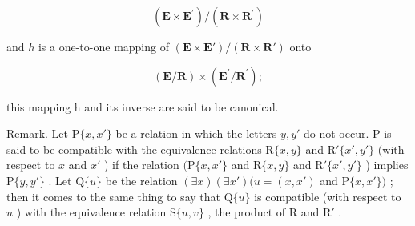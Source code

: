 \[
(\mathbf {E} \times \mathbf {E} ^ {\prime}) / (\mathbf {R} \times \mathbf {R} ^ {\prime})
\]

and \(h\) is a one-to-one mapping of \((\mathbf{E} \times \mathbf{E}') / (\mathbf{R} \times \mathbf{R}')\) onto

\[
(\mathbf {E} / \mathbf {R}) \times (\mathbf {E} ^ {\prime} / \mathbf {R} ^ {\prime});
\]

this mapping h and its inverse are said to be canonical.

Remark. Let \(\mathrm{P}\{x, x'\}\) be a relation in which the letters \(y, y'\) do not occur. P is said to be compatible with the equivalence relations \(\mathrm{R}\{x, y\}\) and \(\mathrm{R}'\{x', y'\}\) (with respect to \(x\) and \(x'\) ) if the relation \((\mathrm{P}\{x, x'\}\) and \(\mathrm{R}\{x, y\}\) and \(\mathrm{R}'\{x', y'\}\) ) implies \(\mathrm{P}\{y, y'\}\) . Let \(\mathrm{Q}\{u\}\) be the relation \((\exists x)(\exists x')(u = (x, x')\) and \(\mathrm{P}\{x, x'\})\) ; then it comes to the same thing to say that \(\mathrm{Q}\{u\}\) is compatible (with respect to \(u\) ) with the equivalence relation \(\mathrm{S}\{u, v\}\) , the product of R and \(\mathrm{R}'\) .

